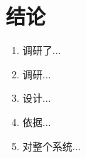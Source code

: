 \section*{结论}


	
	
	\begin{enumerate}
		\item 调研了...
		
		\item 调研...
		
		\item 设计...
				
		\item 依据...	
		
		\item 对整个系统...

		 
	\end{enumerate}
	
\clearpage